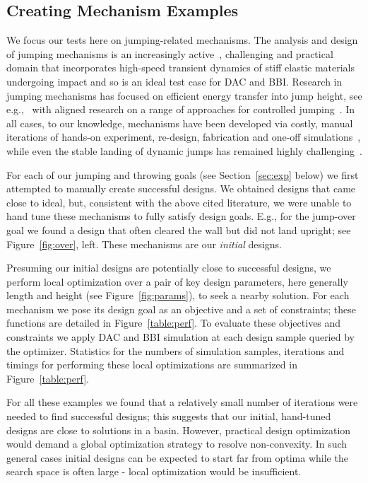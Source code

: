 \subsection{Creating Mechanism Examples} We focus our tests here on jumping-related mechanisms. The analysis and design of jumping mechanisms is an increasingly active~\citep{Churaman:2011,bergbreiter2007design,Bingham:orient,Bergbreiter:2008te,Jung:2014fh,JeSungKoh:2013ga,Koh:2015cy,Vella:2015cw,ShuguangLi:2015kl}, challenging and practical domain that incorporates high-speed transient dynamics of stiff elastic materials undergoing impact and so is an ideal test case for DAC and BBI.
Research in jumping mechanisms has focused on efficient energy transfer into jump height, see e.g.,~\citet{MinkyunNoh:2012fv}
with aligned research on a range of approaches for controlled jumping~\citep{Loepfe:2015ir,Bartlett:2015he,ShuguangLi:2015kl}. In all cases, to our knowledge, mechanisms have been developed via costly, manual iterations of hands-on experiment, re-design, fabrication and one-off simulations~\citep{Cho:2009jl,Bartlett:2015he}, while even the stable landing of dynamic jumps has remained highly challenging~\citep{Jung:2015gm}.

For each of our jumping and throwing goals (see Section~\ref{sec:exp} below) we first attempted to manually create successful designs. We obtained designs that came close to ideal, but, consistent with the above cited literature, we were unable to hand tune these mechanisms to fully satisfy design goals. E.g., for the jump-over goal we found a design that often cleared the wall but did not land upright; see Figure~\ref{fig:over}, left. These mechanisms are our \emph{initial} designs.

Presuming our initial designs are potentially close to successful designs, we perform local optimization over a pair of key design parameters, here generally length and height (see Figure~\ref{fig:params}), to seek a nearby solution. For each mechanism we pose its design goal as an objective and a set of constraints; these functions are detailed in Figure~\ref{table:perf}. To evaluate these objectives and constraints we apply DAC and BBI simulation at each design sample queried by the optimizer. Statistics for the numbers of simulation samples, iterations and timings for performing these local optimizations are summarized in Figure~\ref{table:perf}.

For all these examples we found that a relatively small number of iterations were needed to find successful designs;  this suggests that our initial, hand-tuned designs are close to solutions in a basin. However, practical design optimization would demand a global optimization strategy to resolve non-convexity. In such general cases initial designs can be expected to start far from optima while the search space is often large - local optimization would be insufficient.


